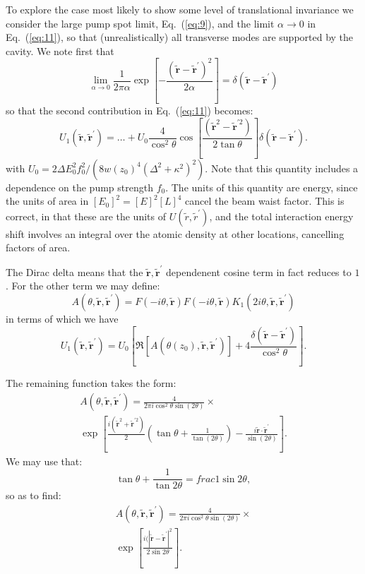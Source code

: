 \documentclass[twocolumn]{revtex4-1}
\renewcommand{\vec}[1]{\mathbf{#1}}
\newcommand{\tvr}{\tilde{\vec{r}}}
\newcommand{\tvrp}{\tilde{\vec{r}}^\prime}
\begin{document}
To explore the case most likely to show some level of translational
invariance we consider the large pump spot limit, Eq.~(\ref{eq:9}),
and the limit $\alpha \to 0$ in Eq.~(\ref{eq:11}), so that
(unrealistically) all transverse modes are supported by the cavity.
We note first that 
\begin{displaymath}
  \lim_{\alpha \to 0}
  \frac{1}{2\pi \alpha}
  \exp\left[
    - \frac{(\tvr-\tvrp)^2}{2 \alpha}
  \right] 
  = \delta(\tvr-\tvrp)
\end{displaymath}
so that the second contribution in Eq.~(\ref{eq:11}) becomes:
\begin{displaymath}
  U_1(\tvr, \tvrp) = \ldots + 
  U_0  \frac{4}{\cos^2\theta}
  \cos\left[ \frac{(\tvr^2 - \tvr^{\prime 2})}{2\tan\theta}  \right]
  \delta(\tvr-\tvrp).
\end{displaymath}
with $U_0 = 2\Delta E_0^2 f_0^2 / (8 w(z_0)^4 (\Delta^2+\kappa^2)^2)$.
Note that this quantity includes a dependence on the pump
strength $f_0$.  The units of this quantity are
energy, since the units of area in $[E_0]^2=[E]^2[L]^4$ cancel the beam
waist factor.  This is correct, in that these are the units 
of $U(\tilde{r}, \tilde{r}^{\prime})$, and the total interaction
energy shift involves an integral over the atomic density at 
other locations, cancelling factors of area.

The Dirac delta means that the $\tvr, \tvrp$ dependenent cosine term
in fact reduces to $1$.  For the other term we may define:
\begin{equation}
  A(\theta, \tvr,\tvrp)=
  F(-i\theta, \tvr) F(-i\theta, \tvr) 
  K_1(2i\theta, \tvr, \tvrp)  
\end{equation}
in terms of which we have 
\begin{equation}
    U_1(\tvr, \tvrp) = U_0 \left[
      \Re[A(\theta(z_0), \tvr,\tvrp)]
      + 
      4 \frac{\delta(\tvr-\tvrp)}{\cos^2\theta}
    \right].
\end{equation}

The remaining function takes the form:
\begin{multline}
  A(\theta,\tvr,\tvrp) = 
  \frac{4 }{2\pi i \cos^2\theta \sin(2\theta)} \times
  \\
  \exp\left[
    \frac{i(\tvr^2 + \tvr^{\prime 2})}{2}
    \left(\tan \theta + \frac{1}{\tan(2\theta)} \right)
    - \frac{i \tvr\cdot\tvrp}{\sin(2\theta)} \right].
\end{multline}
We may use that:
\begin{displaymath}
  \tan \theta + \frac{1}{\tan2\theta}
    = frac{1}{\sin 2 \theta},
\end{displaymath}
so as to find:
\begin{multline}
  A(\theta,\tvr,\tvrp) = 
  \frac{4 }{2\pi i \cos^2\theta \sin(2\theta)} \times
  \\
  \exp\left[
    \frac{i(|\tvr -  \tvr^{\prime}|^2}{2\sin 2 \theta}
  \right].
\end{multline}
\end{document}
